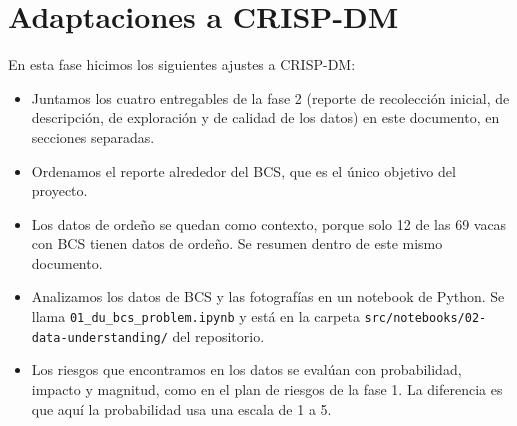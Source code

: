 \section*{Adaptaciones a CRISP-DM}

En esta fase hicimos los siguientes ajustes a CRISP-DM:

\begin{itemize}
  \item Juntamos los cuatro entregables de la fase 2 (reporte de recolección inicial, de descripción, de exploración y de calidad de los datos) en este documento, en secciones separadas.
  \item Ordenamos el reporte alrededor del BCS, que es el único objetivo del proyecto.
  \item Los datos de ordeño se quedan como contexto, porque solo 12 de las 69 vacas con BCS tienen datos de ordeño. Se resumen dentro de este mismo documento.
  \item Analizamos los datos de BCS y las fotografías en un notebook de Python. Se llama \nolinkurl{01_du_bcs_problem.ipynb} y está en la carpeta \nolinkurl{src/notebooks/02-data-understanding/} del repositorio.
  \item Los riesgos que encontramos en los datos se evalúan con probabilidad, impacto y magnitud, como en el plan de riesgos de la fase 1. La diferencia es que aquí la probabilidad usa una escala de 1 a 5.
\end{itemize}
